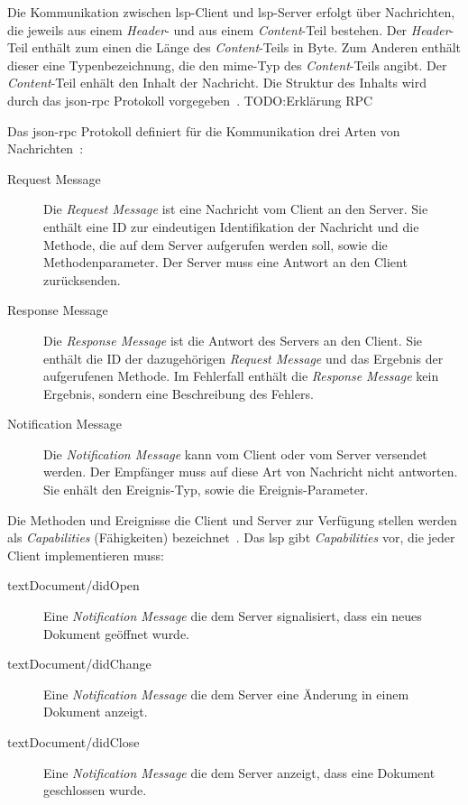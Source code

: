 Die Kommunikation zwischen \ac{lsp}-Client und \ac{lsp}-Server erfolgt über Nachrichten, die jeweils aus einem \textit{Header}- und aus einem \textit{Content}-Teil bestehen.
Der \textit{Header}-Teil enthält zum einen die Länge des \textit{Content}-Teils in Byte. Zum Anderen enthält dieser eine Typenbezeichnung,
die den \ac{mime}-Typ des \textit{Content}-Teils angibt. Der \textit{Content}-Teil enhält den Inhalt der Nachricht. Die Struktur des Inhalts wird durch
das \acs{json}-\acs{rpc} Protokoll vorgegeben~\cite{lsp-microsoft,lsp-medium}. TODO:Erklärung RPC

Das \acs{json}-\acs{rpc} Protokoll definiert für die Kommunikation drei Arten von Nachrichten~\cite{lsp-microsoft}:
\begin{description}
    \item[Request Message] Die \textit{Request Message} ist eine Nachricht vom Client an den Server.
          Sie enthält eine ID zur eindeutigen Identifikation der Nachricht und die Methode, die auf dem Server aufgerufen werden soll, sowie die Methodenparameter.
          Der Server muss eine Antwort an den Client zurücksenden.
    \item[Response Message] Die \textit{Response Message} ist die Antwort des Servers an den Client. Sie enthält die ID der dazugehörigen \textit{Request Message} und das Ergebnis der aufgerufenen Methode.
          Im Fehlerfall enthält die \textit{Response Message} kein Ergebnis, sondern eine Beschreibung des Fehlers.
    \item[Notification Message]  Die \textit{Notification Message} kann vom Client oder vom Server versendet werden.
          Der Empfänger muss auf diese Art von Nachricht nicht antworten.
          Sie enhält den Ereignis-Typ, sowie die Ereignis-Parameter.
\end{description}

Die Methoden und Ereignisse die Client und Server zur Verfügung stellen werden als \textit{Capabilities} (Fähigkeiten) bezeichnet~\cite{lsp-medium}.
Das \ac{lsp} gibt \textit{Capabilities} vor, die jeder Client implementieren muss:
\begin{description}
    \item[textDocument/didOpen] Eine \textit{Notification Message} die dem Server signalisiert, dass ein neues Dokument geöffnet wurde.
    \item[textDocument/didChange] Eine \textit{Notification Message} die dem Server eine Änderung in einem Dokument anzeigt.
    \item[textDocument/didClose]  Eine \textit{Notification Message} die dem Server anzeigt, dass eine Dokument geschlossen wurde.
\end{description}

